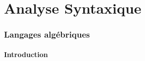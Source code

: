 %
%
%
%
%
%
%
%
% 
% 
%
%
%
% 
%
%
%
% 
% 
\part{Analyse Syntaxique}
 
 
\section{Langages algébriques}
 
\subsection{Introduction}
%
%
%
 
